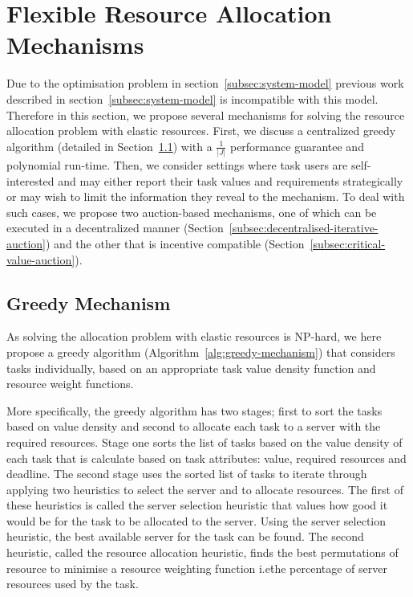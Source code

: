 \section{Flexible Resource Allocation Mechanisms}\label{sec:flexible-resource-allocation-mechanisms}

Due to the optimisation problem in section~\ref{subsec:system-model} previous work described in
section~\ref{subsec:system-model} is incompatible with this model. Therefore in this section, we propose several
mechanisms for solving the resource allocation problem with elastic resources. First, we discuss a centralized greedy
algorithm (detailed in Section~\ref{subsec:greedy-mechanism}) with a $\frac{1}{\left|J\right|}$ performance guarantee
and polynomial run-time. Then, we consider settings where task users are self-interested and may either report their
task values and requirements strategically or may wish to limit the information they reveal to the mechanism. To deal
with such cases, we propose two auction-based mechanisms, one of which can be executed in a decentralized manner
(Section~\ref{subsec:decentralised-iterative-auction}) and the other that is incentive compatible
(Section~\ref{subsec:critical-value-auction}).

\subsection{Greedy Mechanism}\label{subsec:greedy-mechanism}
As solving the allocation problem with elastic resources is NP-hard, we here propose a greedy algorithm
(Algorithm~\ref{alg:greedy-mechanism}) that considers tasks individually, based on an appropriate task value density
function and resource weight functions.

More specifically, the greedy algorithm has two stages; first to sort the tasks based on value density and second to
allocate each task to a server with the required resources. Stage one sorts the list of tasks based on the value
density of each task that is calculate based on task attributes: value, required resources and deadline. The second
stage uses the sorted list of tasks to iterate through applying two heuristics to select the server and to allocate
resources. The first of these heuristics is called the server selection heuristic that values how good it would be
for the task to be allocated to the server. Using the server selection heuristic, the best available server for the
task can be found. The second heuristic, called the resource allocation heuristic, finds the best permutations of
resource to minimise a resource weighting function i.e\. the percentage of server resources used by the task.

